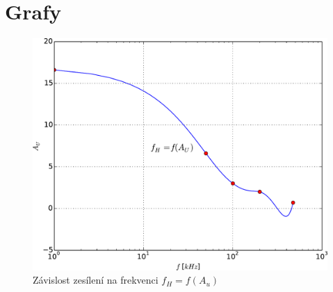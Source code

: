 \section*{Grafy}
\setcounter{figure}{0}
  \renewcommand{\figurename}{Graf č.}
  
  \begin{figure}[H]
    \centering
    \includegraphics[width=16cm]{../img/graf.pdf}
    \caption{Závislost zesílení na frekvenci $f_H = f(A_u)$}
    \label{graf:1}
  \end{figure}
